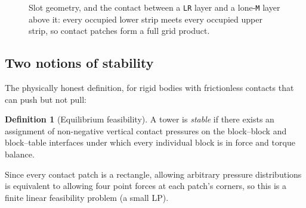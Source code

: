 \documentclass[11pt]{article}
\theoremstyle{definition}
\newtheorem{definition}[theorem]{Definition}
\theoremstyle{remark}
\newcommand{\layer}[1]{\texttt{#1}}
\begin{document}
\begin{figure}[ht]
\centering
{}
\caption{Slot geometry, and the contact between a \layer{LR} layer and a
lone-\layer{M} layer above it: every occupied lower strip meets every
occupied upper strip, so contact patches form a full grid product.}
\label{fig:slots}
\end{figure}

\subsection{Two notions of stability}

The physically honest definition, for rigid bodies with frictionless
contacts that can push but not pull:

\begin{definition}[Equilibrium feasibility]
A tower is \emph{stable} if there exists an assignment of non-negative
vertical contact pressures on the block--block and block--table interfaces
under which every individual block is in force and torque balance.
\end{definition}

Since every contact patch is a rectangle, allowing arbitrary pressure
distributions is equivalent to allowing four point forces at each patch's
corners, so this is a finite linear feasibility problem (a small LP).
\end{document}
